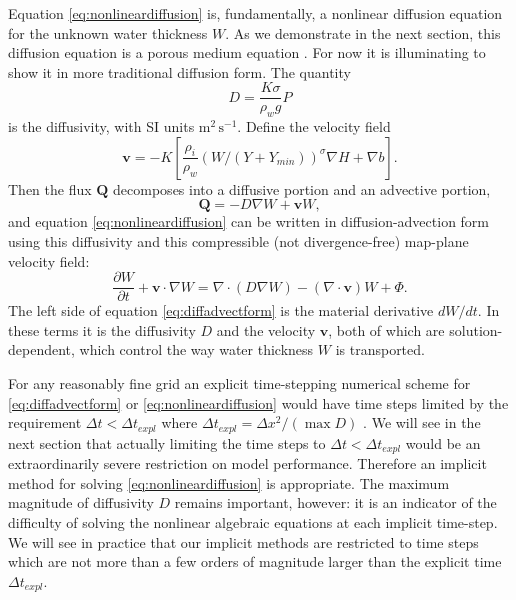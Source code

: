 \documentclass[11pt]{amsart}
\newcommand{\bQ}{\mathbf{Q}}
\newcommand{\bv}{\mathbf{v}}
\begin{document}
Equation \eqref{eq:nonlineardiffusion} is, fundamentally, a nonlinear diffusion equation for the unknown water thickness $W$.  As we demonstrate in the next section, this diffusion equation is a porous medium equation \citep{VazquezPME}.  For now it is illuminating to show it in more traditional diffusion form.  The quantity
\begin{equation}\label{eq:diffusivity}
  D = \frac{K \sigma}{\rho_w g} P
\end{equation}
is the diffusivity, with SI units $\text{m}^2\, \text{s}^{-1}$.  Define the velocity field
\begin{equation}\label{eq:velocity}
  \mathbf{v} = - K \left[ \frac{\rho_i}{\rho_w} \left(W/(Y+Y_{min})\right)^\sigma \nabla H + \nabla b \right].
\end{equation}
Then the flux $\bQ$ decomposes into a diffusive portion and an advective portion,
\begin{equation}\label{eq:fluxdecomposition}
\bQ=-D\nabla W + \bv W,
\end{equation}
and equation \eqref{eq:nonlineardiffusion} can be written in diffusion-advection form using this diffusivity and this compressible (not divergence-free) map-plane velocity field:
\begin{equation}\label{eq:diffadvectform}
\frac{\partial W}{\partial t} + \mathbf{v} \cdot \nabla W = \nabla \cdot \left( D \nabla W \right) - (\nabla \cdot \mathbf{v}) W + \Phi.
\end{equation}
The left side of equation \eqref{eq:diffadvectform} is the material derivative $dW/dt$.    In these terms it is the diffusivity $D$ and the velocity $\mathbf{v}$, both of which are solution-dependent, which control the way water thickness $W$ is transported.

For any reasonably fine grid an explicit time-stepping numerical scheme for \eqref{eq:diffadvectform} or \eqref{eq:nonlineardiffusion} would have time steps limited by the requirement $\Delta t < \Delta t_{expl}$ where $\Delta t_{expl} = \Delta x^2 / (\max D)$ \citep{MortonMayers}.  We will see in the next section that actually limiting the time steps to $\Delta t < \Delta t_{expl}$ would be an extraordinarily severe restriction on model performance.  Therefore an implicit method for solving \eqref{eq:nonlineardiffusion} is appropriate.  The maximum magnitude of diffusivity $D$ remains important, however: it is an indicator of the difficulty of solving the nonlinear algebraic equations at each implicit time-step.  We will see in practice that our implicit methods are restricted to time steps which are not more than a few orders of magnitude larger than the explicit time $\Delta t_{expl}$.
\end{document}
